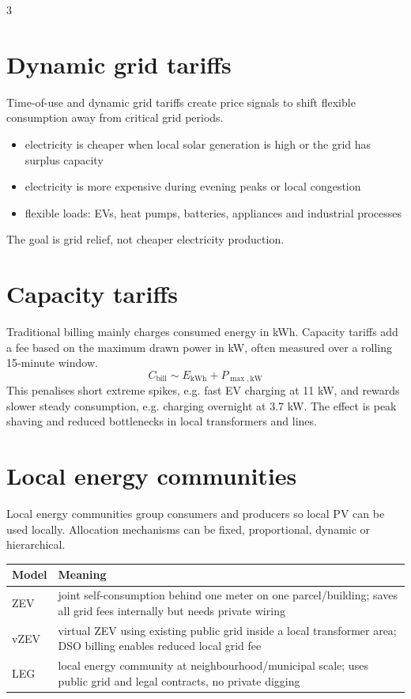 \documentclass[9pt, landscape, a4paper]{article}
\begin{document}
\begin{multicols*}{3}
\section{Dynamic grid tariffs}
Time-of-use and dynamic grid tariffs create price signals to shift flexible
consumption away from critical grid periods.
\begin{itemize}
  \item electricity is cheaper when local solar generation is high or the grid
        has surplus capacity
  \item electricity is more expensive during evening peaks or local congestion
  \item flexible loads: EVs, heat pumps, batteries, appliances and industrial processes
\end{itemize}
The goal is grid relief, not cheaper electricity production.

\section{Capacity tariffs}
Traditional billing mainly charges consumed energy in kWh. Capacity tariffs add
a fee based on the maximum drawn power in kW, often measured over a rolling
15-minute window.
\[
  C_{\mathrm{bill}}\sim E_{\mathrm{kWh}}+P_{\max,\mathrm{kW}}
\]
This penalises short extreme spikes, e.g. fast EV charging at 11 kW, and
rewards slower steady consumption, e.g. charging overnight at 3.7 kW. The
effect is peak shaving and reduced bottlenecks in local transformers and
lines.

\section{Local energy communities}
Local energy communities group consumers and producers so local PV can be used
locally. Allocation mechanisms can be fixed, proportional, dynamic or
hierarchical.

\begin{tabularx}{\columnwidth}{@{}lX@{}}
  \toprule
  \textbf{Model} & \textbf{Meaning}\\
  \midrule
  ZEV & joint self-consumption behind one meter on one parcel/building; saves all grid fees internally but needs private wiring\\
  vZEV & virtual ZEV using existing public grid inside a local transformer area; DSO billing enables reduced local grid fee\\
  LEG & local energy community at neighbourhood/municipal scale; uses public grid and legal contracts, no private digging\\
  \bottomrule
\end{tabularx}


\end{multicols*}
\end{document}
